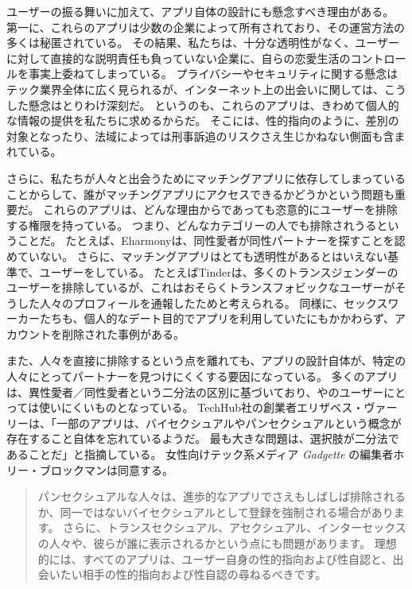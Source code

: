 \documentclass[paper=a4,book,openany]{jlreq}
\begin{document}
ユーザーの振る舞いに加えて、アプリ自体の設計にも懸念すべき理由がある。
第一に、これらのアプリは少数の企業によって所有されており、その運営方法の多くは秘匿されている。
その結果、私たちは、十分な透明性がなく、ユーザーに対して直接的な説明責任も負っていない企業に、自らの恋愛生活のコントロールを事実上委ねてしまっている。
プライバシーやセキュリティに関する懸念はテック業界全体に広く見られるが、インターネット上の出会いに関しては、こうした懸念はとりわけ深刻だ。
というのも、これらのアプリは、きわめて個人的な情報の提供を私たちに求めるからだ。
そこには、性的指向のように、差別の対象となったり、法域によっては刑事訴追のリスクさえ生じかねない側面も含まれている。

さらに、私たちが人々と出会うためにマッチングアプリに依存してしまっていることからして、誰がマッチングアプリにアクセスできるかどうかという問題も重要だ。
これらのアプリは、どんな理由からであっても恣意的にユーザーを排除する権限を持っている。
つまり、どんなカテゴリーの人でも排除されうるということだ。
たとえば、Eharmonyは、同性愛者が同性パートナーを探すことを認めていない。
さらに、マッチングアプリはとても透明性があるとはいえない基準で、ユーザーをしている。
たとえばTinderは、多くのトランスジェンダーのユーザーを排除しているが、これはおそらくトランスフォビックなユーザーがそうした人々のプロフィールを通報したためと考えられる\citep{tierney17:_why_are_tran}。
同様に、セックスワーカーたちも、個人的なデート目的でアプリを利用していたにもかかわらず、アカウントを削除された事例がある\citep{al-othman18:_sex_work_say}。

また、人々を直接に排除するという点を離れても、アプリの設計自体が、特定の人々にとってパートナーを見つけにくくする要因になっている。
多くのアプリは、異性愛者／同性愛者という二分法の区別に基づいており、やのユーザーにとっては使いにくいものとなっている。
TechHub社の創業者エリザベス・ヴァーリーは、「一部のアプリは、バイセクシュアルやパンセクシュアルという概念が存在すること自体を忘れているようだ。
最も大きな問題は、選択肢が二分法であることだ」と指摘している。
女性向けテック系メディア \emph{Gadgette} の編集者ホリー・ブロックマンは同意する。

\begin{quote}
  パンセクシュアルな人々は、進歩的なアプリでさえもしばしば排除されるか、同一ではないバイセクシュアルとして登録を強制される場合があります。
さらに、トランスセクシュアル、アセクシュアル、インターセックスの人々や、彼らが誰に表示されるかという点にも問題があります。
理想的には、すべてのアプリは、ユーザー自身の性的指向および性自認と、出会いたい相手の性的指向および性自認の尋ねるべきです。
\citep{knowles16:_bisex_prob}
\end{quote}
\end{document}
